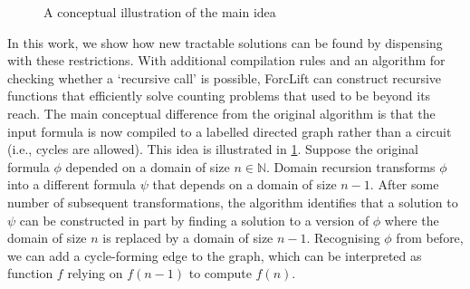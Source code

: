 \begin{figure}[t]
  \centering
  \caption{A conceptual illustration of the main idea}
  \label{fig:idea}
\end{figure}

In this work, we show how new tractable solutions can be found by dispensing with these restrictions. With additional compilation rules and an algorithm for checking whether a `recursive call' is possible, ForcLift \citep{DBLP:conf/ijcai/BroeckTMDR11} can construct recursive functions that efficiently solve counting problems that used to be beyond its reach. The main conceptual difference from the original algorithm is that the input formula is now compiled to a labelled directed graph rather than a circuit (i.e., cycles are allowed). This idea is illustrated in \cref{fig:idea}. Suppose the original formula $\phi$ depended on a domain of size $n \in \mathbb{N}$. Domain recursion transforms $\phi$ into a different formula $\psi$ that depends on a domain of size $n-1$. After some number of subsequent transformations, the algorithm identifies that a solution to $\psi$ can be constructed in part by finding a solution to a version of $\phi$ where the domain of size $n$ is replaced by a domain of size $n-1$. Recognising $\phi$ from before, we can add a cycle-forming edge to the graph, which can be interpreted as function $f$ relying on $f(n-1)$ to compute $f(n)$.

